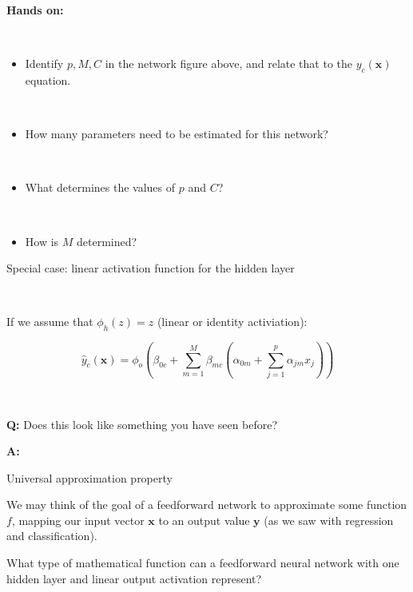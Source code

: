 \documentclass[10pt,ignorenonframetext,]{beamer}
\providecommand{\tightlist}{%
  \setlength{\itemsep}{0pt}\setlength{\parskip}{0pt}}
\begin{document}
\begin{frame}

\textbf{Hands on:}

\(~\)

\begin{itemize}
\tightlist
\item
  Identify \(p, M, C\) in the network figure above, and relate that to
  the \(y_{c}({\boldsymbol x})\) equation.
\end{itemize}

\(~\)

\begin{itemize}
\tightlist
\item
  How many parameters need to be estimated for this network?
\end{itemize}

\(~\)

\begin{itemize}
\tightlist
\item
  What determines the values of \(p\) and \(C\)?
\end{itemize}

\(~\)

\begin{itemize}
\tightlist
\item
  How is \(M\) determined?
\end{itemize}

\end{frame}

\begin{frame}

\begin{block}{Special case: linear activation function for the hidden
layer}

\(~\)

If we assume that \(\phi_h(z)=z\) (linear or identity activiation):

\[
\hat{y}_c({\boldsymbol x})=\phi_o(\beta_{0c}+\sum_{m=1}^M \beta_{mc}(\alpha_{0m}+\sum_{j=1}^p \alpha_{jm}x_{j}))
\]

\(~\)

\textbf{Q:} Does this look like something you have seen before?

\textbf{A:}

\end{block}

\end{frame}

\begin{frame}

\begin{block}{Universal approximation property}

We may think of the goal of a feedforward network to approximate some
function \(f\), mapping our input vector \({\boldsymbol x}\) to an
output value \({\boldsymbol y}\) (as we saw with regression and
classification).

What type of mathematical function can a feedforward neural network with
one hidden layer and linear output activation represent?

\end{block}

\end{frame}
\end{document}
